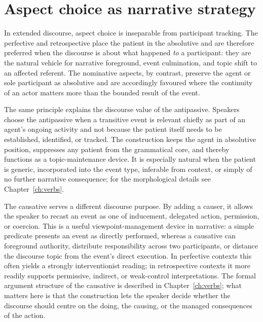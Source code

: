 \section{Aspect choice as narrative strategy}\label{sec:aspect-narrative}


In extended discourse, aspect choice is inseparable from participant tracking.
The perfective and retrospective place the patient in the absolutive and are
therefore preferred when the discourse is about what happened \emph{to} a
participant: they are the natural vehicle for narrative foreground, event
culmination, and topic shift to an affected referent. The nominative aspects, by
contrast, preserve the agent or sole participant as absolutive and are
accordingly favoured where the continuity of an actor matters more than the
bounded result of the event.

The same principle explains the discourse value of the antipassive. Speakers
choose the antipassive when a transitive event is relevant chiefly as part of an
agent's ongoing activity and not because the patient itself needs to be
established, identified, or tracked. The construction keeps the agent in
absolutive position, suppresses any patient from the grammatical core, and
thereby functions as a topic-maintenance device. It is especially natural when
the patient is generic, incorporated into the event type, inferable from
context, or simply of no further narrative consequence; for the morphological
details see Chapter~\ref{ch:verbs}.

The causative serves a different discourse purpose. By adding a causer, it
allows the speaker to recast an event as one of inducement, delegated action,
permission, or coercion. This is a useful viewpoint-management device in
narrative: a simple predicate presents an event as directly performed, whereas a
causative can foreground authority, distribute responsibility across two
participants, or distance the discourse topic from the event's direct execution.
In perfective contexts this often yields a strongly interventionist reading; in
retrospective contexts it more readily supports permissive, indirect, or
weak-control interpretations. The formal argument structure of the causative is
described in Chapter~\ref{ch:verbs}; what matters here is that the construction
lets the speaker decide whether the discourse should centre on the doing, the
causing, or the managed consequences of the action.

